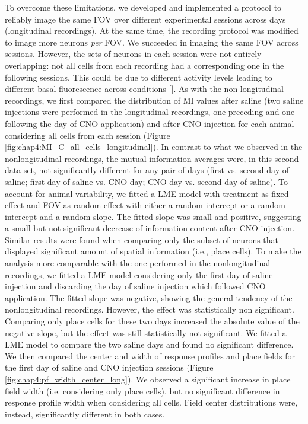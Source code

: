 To overcome these limitations, we developed and implemented a protocol to reliably image the same FOV over different experimental sessions across days (longitudinal recordings).
At the same time, the recording protocol was modified to image more neurons \textit{per} FOV.
We succeeded in imaging the same FOV across sessions. 
However, the sets of neurons in each session were not entirely overlapping: not all cells from each recording had a corresponding one in the following sessions. 
This could be due to different activity levels leading to different basal fluorescence across conditions [\cite{chen2013}].
As with the non-longitudinal recordings, we first compared the distribution of MI values after saline (two saline injections were performed in the longitudinal recordings, one preceding and one following the day of CNO application) and after CNO injection for each animal considering all cells from each session (Figure \ref{fig:chap4:MI_C_all_cells_longitudinal}).
In contrast to what we observed in the nonlongitudinal recordings, the mutual information averages were, in this second data set, not significantly different for any pair of days (first vs. second day of saline; first day of saline vs. CNO day; CNO day vs. second day of saline).
To account for animal variability, we fitted a LME model with treatment as fixed effect and FOV as random effect with either a random intercept or a random intercept and a random slope.
The fitted slope was small and positive, suggesting a small but not significant decrease of information content after CNO injection.
Similar results were found when comparing only the subset of neurons that displayed significant amount of spatial information (i.e., place cells). 
To make the analysis more comparable with the one performed in the nonlongitudinal recordings, we fitted a LME model considering only the first day of saline injection and discarding the day of saline injection which followed CNO application.
The fitted slope was negative, showing the general tendency of the nonlongitudinal recordings. 
However, the effect was statistically non significant. 
Comparing only place cells for these two days increased the absolute value of the negative slope, but the effect was still statistically not significant. 
We fitted a LME model to compare the two saline days and found no significant difference. 
We then compared the center and width of response profiles and place fields for the first day of saline and CNO injection sessions (Figure \ref{fig:chap4:pf_width_center_long}). 
We observed a significant increase in place field width (i.e. considering only place cells), but no significant difference in response profile width when considering all cells.
Field center distributions were, instead, significantly different in both cases. 


